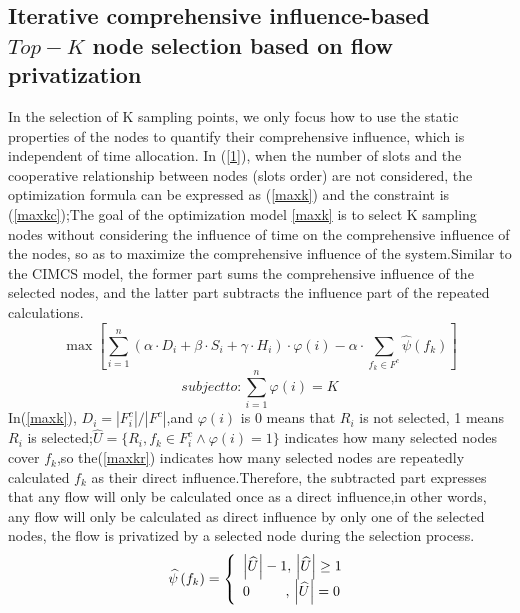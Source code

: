 \documentclass[conference]{IEEEtran}
\begin{document}
\subsection{Iterative comprehensive influence-based $Top-K$ node selection based on flow privatization} 
In the selection of K sampling points, we only focus how to use the static properties of the nodes to quantify their comprehensive influence, which is independent of time allocation. In (\ref{1}), when the number of slots and the cooperative relationship between nodes (slots order) are not considered, the optimization formula can be expressed as (\ref{maxk}) and the constraint is (\ref{maxkc});The goal of the optimization model \ref{maxk} is to select K sampling nodes without considering the influence of time on the comprehensive influence of the nodes, so as to maximize the comprehensive influence of the system.Similar to the CIMCS model, the former part sums the comprehensive influence of the selected nodes, and the latter part subtracts the influence part of the repeated calculations.
\begin{equation}
\max [\sum_{i=1}^n (\alpha \cdot {D_{i}} + \beta \cdot {S_{i}} + \gamma \cdot {H_{i}}) \cdot \varphi{(i)} - \alpha \cdot\sum_{f_k \in F^c} \widehat{\psi}{(f_k)}]
\label{maxk}
\end{equation}
\begin{equation}
subject to:\sum_{i=1}^{n} \varphi(i) = K
\label{maxkc}
\end{equation}
In(\ref{maxk}), $D_i=|F^c_i|/|F^c|$,and $\varphi(i)$ is 0 means that $R_i$ is not selected, 1 means $R_i$ is selected;$\widehat{U} = \{R_i,f_k \in F^c_i \wedge \varphi(i) = 1\}$ indicates how many selected nodes cover $f_k$,so the(\ref{maxkr}) indicates how many selected nodes are repeatedly calculated $f_k$ as their direct influence.Therefore, the subtracted part expresses that any flow will only be calculated once as a direct influence,in other words, any flow will only be calculated as direct influence by only one of the selected nodes, the flow is privatized by a selected node during the selection process.
\begin{equation}
\widehat{\psi} \left( {{f_k}} \right) = \left\{ \begin{array}{l}
\left| \widehat{U} \right| - 1,{\rm{    }}\left| \widehat{U} \right| \ge 1\\
{\rm{   }}0\quad \quad \; \; ,\, \left| \widehat{U} \right| = 0
\end{array} \right.
\label{maxkr}
\end{equation}
\end{document}
